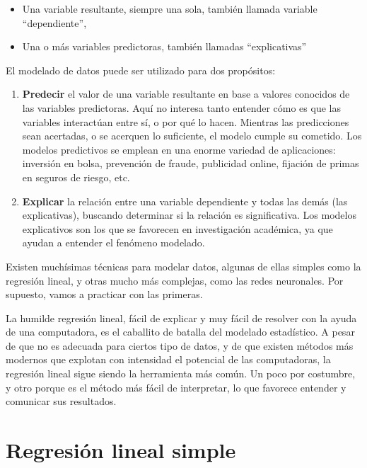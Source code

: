 \documentclass[]{book}
\providecommand{\tightlist}{%
  \setlength{\itemsep}{0pt}\setlength{\parskip}{0pt}}
\begin{document}
\begin{itemize}
\tightlist
\item
  Una variable resultante, siempre una sola, también llamada variable
  ``dependiente'',
\item
  Una o más variables predictoras, también llamadas ``explicativas''
\end{itemize}

El modelado de datos puede ser utilizado para dos propósitos:

\begin{enumerate}
\def\labelenumi{\arabic{enumi}.}
\item
  \textbf{Predecir} el valor de una variable resultante en base a
  valores conocidos de las variables predictoras. Aquí no interesa tanto
  entender cómo es que las variables interactúan entre sí, o por qué lo
  hacen. Mientras las predicciones sean acertadas, o se acerquen lo
  suficiente, el modelo cumple su cometido. Los modelos predictivos se
  emplean en una enorme variedad de aplicaciones: inversión en bolsa,
  prevención de fraude, publicidad online, fijación de primas en seguros
  de riesgo, etc.
\item
  \textbf{Explicar} la relación entre una variable dependiente y todas
  las demás (las explicativas), buscando determinar si la relación es
  significativa. Los modelos explicativos son los que se favorecen en
  investigación académica, ya que ayudan a entender el fenómeno
  modelado.
\end{enumerate}

Existen muchísimas técnicas para modelar datos, algunas de ellas simples
como la regresión lineal, y otras mucho más complejas, como las redes
neuronales. Por supuesto, vamos a practicar con las primeras.

La humilde regresión lineal, fácil de explicar y muy fácil de resolver
con la ayuda de una computadora, es el caballito de batalla del modelado
estadístico. A pesar de que no es adecuada para ciertos tipo de datos, y
de que existen métodos más modernos que explotan con intensidad el
potencial de las computadoras, la regresión lineal sigue siendo la
herramienta más común. Un poco por costumbre, y otro porque es el método
más fácil de interpretar, lo que favorece entender y comunicar sus
resultados.

\section{Regresión lineal simple}\label{regresion-lineal-simple}
\end{document}
